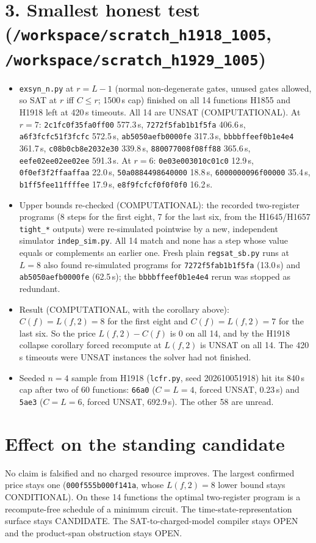 \documentclass[11pt]{article}
\begin{document}
\section*{3. Smallest honest test (\texttt{/workspace/scratch\_h1918\_1005}, \texttt{/workspace/scratch\_h1929\_1005})}
\begin{itemize}
\item \texttt{exsyn\_n.py} at $r=L-1$ (normal non-degenerate gates, unused gates allowed, so SAT at $r$ iff $C\le r$; 1500\,s cap) finished on all 14 functions H1855 and H1918 left at 420\,s timeouts. All 14 are UNSAT (COMPUTATIONAL). At $r=7$: \texttt{2c1fc0f35fa0ff00} 577.3\,s, \texttt{7272f5fab1b1f5fa} 406.6\,s, \texttt{a6f3fcfc51f3fcfc} 572.5\,s, \texttt{ab5050aefb0000fe} 317.3\,s, \texttt{bbbbffeef0b1e4e4} 361.7\,s, \texttt{c08b0cb8e2032e30} 339.8\,s, \texttt{880077008f08ff88} 365.6\,s, \texttt{eefe02ee02ee02ee} 591.3\,s. At $r=6$: \texttt{0e03e003010c01c0} 12.9\,s, \texttt{0f0ef3f2ffaaffaa} 22.0\,s, \texttt{50a0884498640000} 18.8\,s, \texttt{6000000096f00000} 35.4\,s, \texttt{b1ff5fee11ffffee} 17.9\,s, \texttt{e8f9fcfcf0f0f0f0} 16.2\,s.
\item Upper bounds re-checked (COMPUTATIONAL): the recorded two-register programs (8 steps for the first eight, 7 for the last six, from the H1645/H1657 \texttt{tight\_*} outputs) were re-simulated pointwise by a new, independent simulator \texttt{indep\_sim.py}. All 14 match and none has a step whose value equals or complements an earlier one. Fresh plain \texttt{regsat\_sb.py} runs at $L=8$ also found re-simulated programs for \texttt{7272f5fab1b1f5fa} (13.0\,s) and \texttt{ab5050aefb0000fe} (62.5\,s); the \texttt{bbbbffeef0b1e4e4} rerun was stopped as redundant.
\item Result (COMPUTATIONAL, with the corollary above): $C(f)=L(f,2)=8$ for the first eight and $C(f)=L(f,2)=7$ for the last six. So the price $L(f,2)-C(f)$ is $0$ on all 14, and by the H1918 collapse corollary forced recompute at $L(f,2)$ is UNSAT on all 14. The 420\,s timeouts were UNSAT instances the solver had not finished.
\item Seeded $n=4$ sample from H1918 (\texttt{lcfr.py}, seed 202610051918) hit its 840\,s cap after two of 60 functions: \texttt{66a0} ($C=L=4$, forced UNSAT, 0.23\,s) and \texttt{5ae3} ($C=L=6$, forced UNSAT, 692.9\,s). The other 58 are unread.
\end{itemize}

\section*{Effect on the standing candidate}
No claim is falsified and no charged resource improves. The largest confirmed price stays one (\texttt{000f555b000f141a}, whose $L(f,2)=8$ lower bound stays CONDITIONAL). On these 14 functions the optimal two-register program is a recompute-free schedule of a minimum circuit. The time-state-representation surface stays CANDIDATE. The SAT-to-charged-model compiler stays OPEN and the product-span obstruction stays OPEN.
\end{document}

